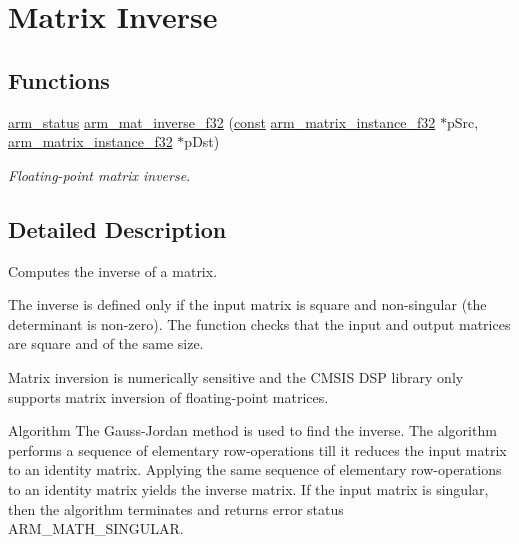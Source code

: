 \hypertarget{group___matrix_inv}{\section{Matrix Inverse}
\label{group___matrix_inv}
}
\subsection*{Functions}
\begin{DoxyCompactItemize}
\item 
\hyperlink{arm__math_8h_a5e459c6409dfcd2927bb8a57491d7cf6}{arm\-\_\-status} \hyperlink{group___matrix_inv_ga542be7aabbf7a2297a4b62cf212910e3}{arm\-\_\-mat\-\_\-inverse\-\_\-f32} (\hyperlink{group___n_a_m_e_ga7ae6d0e43244213b34de2c2b9aa30da6}{const} \hyperlink{structarm__matrix__instance__f32}{arm\-\_\-matrix\-\_\-instance\-\_\-f32} $\ast$p\-Src, \hyperlink{structarm__matrix__instance__f32}{arm\-\_\-matrix\-\_\-instance\-\_\-f32} $\ast$p\-Dst)
\begin{DoxyCompactList}\small\item\em Floating-\/point matrix inverse. \end{DoxyCompactList}\end{DoxyCompactItemize}


\subsection{Detailed Description}
Computes the inverse of a matrix.

The inverse is defined only if the input matrix is square and non-\/singular (the determinant is non-\/zero). The function checks that the input and output matrices are square and of the same size.

Matrix inversion is numerically sensitive and the C\-M\-S\-I\-S D\-S\-P library only supports matrix inversion of floating-\/point matrices.

\begin{DoxyParagraph}{Algorithm }
The Gauss-\/\-Jordan method is used to find the inverse. The algorithm performs a sequence of elementary row-\/operations till it reduces the input matrix to an identity matrix. Applying the same sequence of elementary row-\/operations to an identity matrix yields the inverse matrix. If the input matrix is singular, then the algorithm terminates and returns error status {\ttfamily A\-R\-M\-\_\-\-M\-A\-T\-H\-\_\-\-S\-I\-N\-G\-U\-L\-A\-R}.  
\end{DoxyParagraph}


